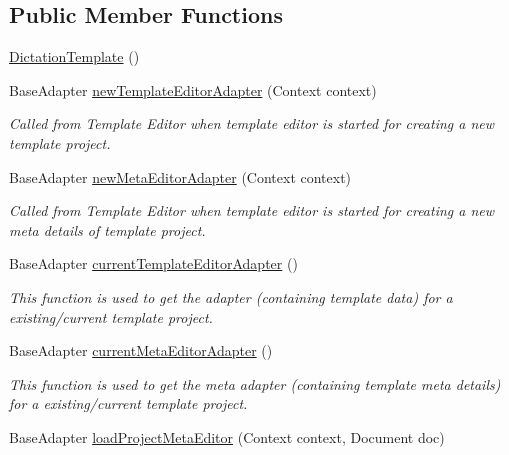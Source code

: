 \subsection*{Public Member Functions}
\begin{DoxyCompactItemize}
\item 
\hyperlink{classorg_1_1buildmlearn_1_1toolkit_1_1templates_1_1DictationTemplate_a8cb001ee5bb6a0afe7d36de75e11df24}{Dictation\+Template} ()
\item 
Base\+Adapter \hyperlink{classorg_1_1buildmlearn_1_1toolkit_1_1templates_1_1DictationTemplate_a542e53bbf25ac060d200dd7e10a2734d}{new\+Template\+Editor\+Adapter} (Context context)
\begin{DoxyCompactList}\small\item\em Called from Template Editor when template editor is started for creating a new template project. \end{DoxyCompactList}\item 
Base\+Adapter \hyperlink{classorg_1_1buildmlearn_1_1toolkit_1_1templates_1_1DictationTemplate_acc7b175f92340d0f974e4aad90836e6c}{new\+Meta\+Editor\+Adapter} (Context context)
\begin{DoxyCompactList}\small\item\em Called from Template Editor when template editor is started for creating a new meta details of template project. \end{DoxyCompactList}\item 
Base\+Adapter \hyperlink{classorg_1_1buildmlearn_1_1toolkit_1_1templates_1_1DictationTemplate_a0be6195b7a866a35ddb48140af45476e}{current\+Template\+Editor\+Adapter} ()
\begin{DoxyCompactList}\small\item\em This function is used to get the adapter (containing template data) for a existing/current template project. \end{DoxyCompactList}\item 
Base\+Adapter \hyperlink{classorg_1_1buildmlearn_1_1toolkit_1_1templates_1_1DictationTemplate_a11b1e13a09c920dcff58d4e728c5eb0b}{current\+Meta\+Editor\+Adapter} ()
\begin{DoxyCompactList}\small\item\em This function is used to get the meta adapter (containing template meta details) for a existing/current template project. \end{DoxyCompactList}\item 
Base\+Adapter \hyperlink{classorg_1_1buildmlearn_1_1toolkit_1_1templates_1_1DictationTemplate_a5d9ca6a357b87c0ab67230ed4a8b10ad}{load\+Project\+Meta\+Editor} (Context context, Document doc)

\end{DoxyCompactItemize}

